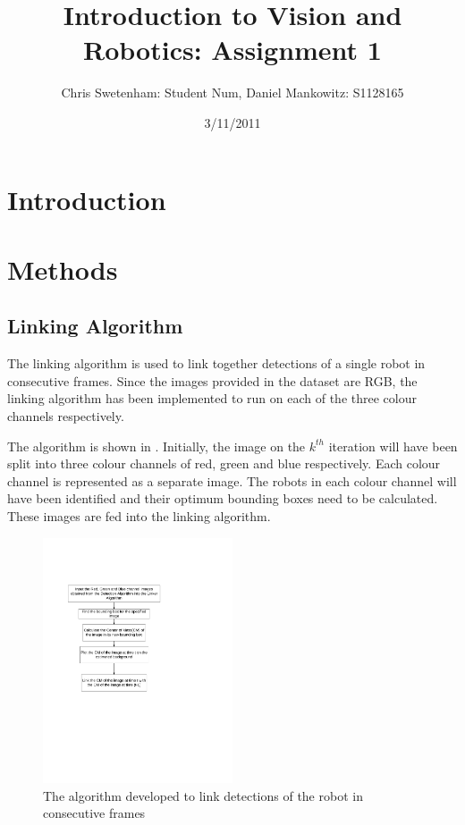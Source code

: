 \documentclass{article}
\title{Introduction to Vision and Robotics: Assignment 1}
\author{Chris Swetenham: Student Num, Daniel Mankowitz: S1128165}
\date{3/11/2011}
\begin{document}
\maketitle

\section{Introduction}
\label{sec:introduction}


\section{Methods}
\label{sec:methods}





\subsection{Linking Algorithm}
\label{sec:linking}
The linking algorithm is used to link together detections of a single robot in consecutive frames. Since the images provided in the dataset are RGB, the linking algorithm has been implemented to run on each of the three colour channels respectively. 

The algorithm is shown in . Initially, the image on the $k^{th}$ iteration will have been split into three colour channels of red, green and blue respectively. Each colour channel is represented as a separate image. The robots in each colour channel will have been identified and their optimum bounding boxes need to be calculated. These images are fed into the linking algorithm. 


\begin{figure}[h!] 
  \centering
    \includegraphics[width=0.5\textwidth]{../Drawings/linkingAlgorithm.pdf}
    \caption{The algorithm developed to link detections of the robot in consecutive frames}
    \label{fig:link}
\end{figure}
\end{document}
